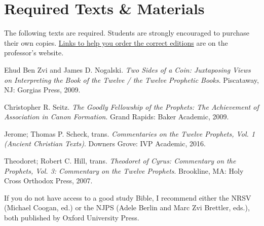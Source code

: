 \documentclass[titlepage]{article}
\newcommand\incl{../includes}
\begin{document}


%

\section{Required Texts \& Materials}
\label{texts}

The following texts are required. Students are strongly encouraged to
purchase their own copies. \href{http://danieldriver.com/courses/hb-3114/#required-texts-winter-2018}{Links to help you order the correct editions} are on the professor's website.

\begingroup
\renewcommand{\section}[2]{}%
\begin{thebibliography}{Theodoret}%

	 Ehud Ben Zvi and James D. Nogalski.
	\emph{Two Sides of a Coin: Juxtaposing Views on Interpreting the Book of the Twelve / the Twelve Prophetic Books}.
	Piscataway, NJ: Gorgias Press, 2009.

	 Christopher R. Seitz.
	\emph{The Goodly Fellowship of the Prophets: The Achievement of Association in Canon Formation}.
	Grand Rapids: Baker Academic, 2009.

	 Jerome; Thomas P. Scheck, trans.
	\emph{Commentaries on the Twelve Prophets, Vol. 1 (Ancient Christian Texts)}.
	Downers Grove: IVP Academic, 2016.

	 Theodoret; Robert C. Hill, trans.
	\emph{Theodoret of Cyrus: Commentary on the Prophets, Vol. 3: Commentary on the Twelve Prophets}.
	Brookline, MA: Holy Cross Orthodox Press, 2007.

\end{thebibliography}
\endgroup

If you do not have access to a good study Bible, I recommend either the
NRSV (Michael Coogan, ed.) or the NJPS (Adele Berlin and Marc Zvi
Brettler, eds.), both published by Oxford University Press.
\end{document}
